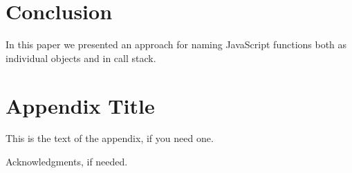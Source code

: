 \documentclass[10pt, preprint]{sigplanconf}
\begin{document}
\section{Conclusion}
In this paper we presented an approach for naming JavaScript functions both
as individual objects and in call stack. 





\appendix
\section{Appendix Title}

This is the text of the appendix, if you need one.

\acks

Acknowledgments, if needed.


%


\end{document}
